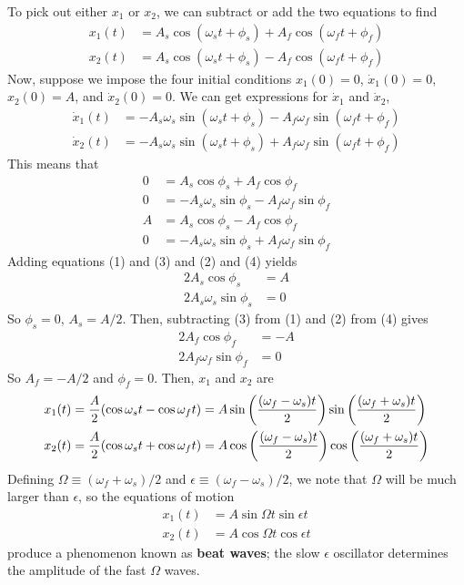 To pick out either $x_1$ or $x_2$, we can subtract or add the two equations to find
\begin{align*}
    x_1(t) &= A_s\cos(\omega_st+\phi_s) + A_f\cos(\omega_ft+\phi_f) \\
    x_2(t) &= A_s\cos(\omega_st+\phi_s)-A_f\cos(\omega_ft+\phi_f)
\end{align*}
Now, suppose we impose the four initial conditions $x_1(0)=0$, $\dot x_1(0)=0$, $x_2(0)=A$, and $\dot x_2(0)=0$. We can get expressions for $\dot x_1$ and $\dot x_2$,
\begin{align*}
    \dot x_1(t) &= -A_s\omega_s\sin(\omega_s t+\phi_s) - A_f\omega_f\sin(\omega_ft+\phi_f) \\
    \dot x_2(t) &= -A_s\omega_s\sin(\omega_s t+\phi_s) + A_f\omega_f\sin(\omega_ft+\phi_f)
\end{align*}
This means that
\begin{align*}
    0 &= A_s\cos\phi_s + A_f\cos \phi_f \\
    0&= -A_s\omega_s\sin\phi_s -A_f\omega_f\sin\phi_f \\
    A &= A_s\cos\phi_s - A_f\cos\phi_f \\
    0 &= -A_s\omega_s\sin\phi_s + A_f\omega_f\sin\phi_f
\end{align*}
Adding equations (1) and (3) and (2) and (4) yields
\begin{align*}
    2A_s\cos\phi_s &= A \\
    2A_s\omega_s\sin\phi_s &= 0
\end{align*}
So $\phi_s = 0$, $A_s=A/2$. Then, subtracting (3) from (1) and (2) from (4) gives
\begin{align*}
    2A_f\cos\phi_f &= -A \\
    2A_f\omega_f\sin\phi_f &= 0
\end{align*}
So $A_f = -A/2$ and $\phi_f = 0$. Then, $x_1$ and $x_2$ are
\begin{align*}
    x_1(t) &= \frac{A}{2}(\cos\omega_s t - \cos \omega_f t) = A\sin\pqty{\frac{(\omega_f-\omega_s)t}{2}}\sin\pqty{\frac{(\omega_f+\omega_s)t}{2}} \\
    x_2(t) &= \frac{A}{2}(\cos \omega_s t + \cos\omega_f t)= A\cos\pqty{\frac{(\omega_f-\omega_s)t}{2}}\cos\pqty{\frac{(\omega_f+\omega_s)t}{2}}
\end{align*}
Defining $\Omega \equiv (\omega_f+\omega_s)/2$ and $\epsilon\equiv (\omega_f-\omega_s)/2$, we note that $\Omega$ will be much larger than $\epsilon$, so the equations of motion
\begin{align*}
    x_1(t) &= A\sin\Omega t\sin\epsilon t \\
    x_2(t) &= A\cos\Omega t\cos\epsilon t
\end{align*}
produce a phenomenon known as \textbf{beat waves}; the slow $\epsilon$ oscillator determines the amplitude of the fast $\Omega$ waves.

